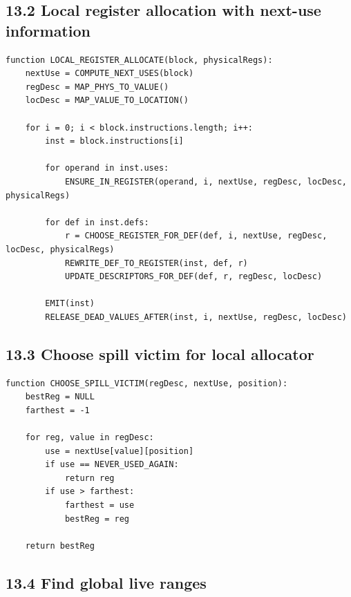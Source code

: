 \documentclass[10pt,letterpaper]{article}
\begin{document}
\subsection*{13.2 Local register allocation with next-use information}

\begin{verbatim}
function LOCAL_REGISTER_ALLOCATE(block, physicalRegs):
    nextUse = COMPUTE_NEXT_USES(block)
    regDesc = MAP_PHYS_TO_VALUE()
    locDesc = MAP_VALUE_TO_LOCATION()

    for i = 0; i < block.instructions.length; i++:
        inst = block.instructions[i]

        for operand in inst.uses:
            ENSURE_IN_REGISTER(operand, i, nextUse, regDesc, locDesc, physicalRegs)

        for def in inst.defs:
            r = CHOOSE_REGISTER_FOR_DEF(def, i, nextUse, regDesc, locDesc, physicalRegs)
            REWRITE_DEF_TO_REGISTER(inst, def, r)
            UPDATE_DESCRIPTORS_FOR_DEF(def, r, regDesc, locDesc)

        EMIT(inst)
        RELEASE_DEAD_VALUES_AFTER(inst, i, nextUse, regDesc, locDesc)
\end{verbatim}

\subsection*{13.3 Choose spill victim for local allocator}

\begin{verbatim}
function CHOOSE_SPILL_VICTIM(regDesc, nextUse, position):
    bestReg = NULL
    farthest = -1

    for reg, value in regDesc:
        use = nextUse[value][position]
        if use == NEVER_USED_AGAIN:
            return reg
        if use > farthest:
            farthest = use
            bestReg = reg

    return bestReg
\end{verbatim}

\subsection*{13.4 Find global live ranges}
\end{document}
